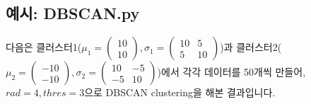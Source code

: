 \documentclass{oblivoir}
\begin{document}
  \subsection{예시: DBSCAN.py}
  다음은 클러스터1($\mu_1=\begin{pmatrix}10\\10\end{pmatrix},\sigma_1=\begin{pmatrix}10&5\\5&10\end{pmatrix}$)과
  클러스터2($\mu_2=\begin{pmatrix}-10\\-10\end{pmatrix},\sigma_2=\begin{pmatrix}10&-5\\-5&10\end{pmatrix}$)에서
  각각 데이터를 50개씩 만들어, $rad=4,thres=3$으로 DBSCAN clustering을 해본 결과입니다.
\end{document}
